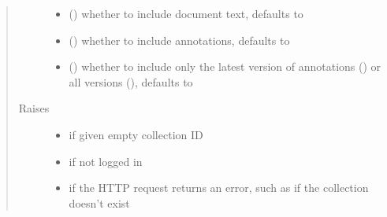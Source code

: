 \documentclass[letterpaper,10pt,english]{sphinxmanual}
\begin{document}
\begin{fulllineitems}
\begin{fulllineitems}
\begin{quote}
\begin{description}
\begin{itemize}
\item {} 
\sphinxAtStartPar
{} () \textendash{} whether to include document text, defaults to 

\item {} 
\sphinxAtStartPar
{} () \textendash{} whether to include annotations, defaults to 

\item {} 
\sphinxAtStartPar
{} () \textendash{} whether to include only the latest version
of annotations () or all versions (), defaults to 

\end{itemize}

\item[{Raises}] \leavevmode\begin{itemize}
\item {} 
\sphinxAtStartPar
{\hyperref[\detokenize{autoapi/pine/client/exceptions/index:pine.client.exceptions.PineClientValueException}]{}} \textendash{} if given empty collection ID

\item {} 
\sphinxAtStartPar
{\hyperref[\detokenize{autoapi/pine/client/exceptions/index:pine.client.exceptions.PineClientAuthException}]{}} \textendash{} if not logged in

\item {} 
\sphinxAtStartPar
{\hyperref[\detokenize{autoapi/pine/client/exceptions/index:pine.client.exceptions.PineClientHttpException}]{}} \textendash{} if the HTTP request returns an error, such as if the
collection doesn’t exist


\end{itemize}
\end{description}
\end{quote}
\end{fulllineitems}
\end{fulllineitems}
\end{document}
